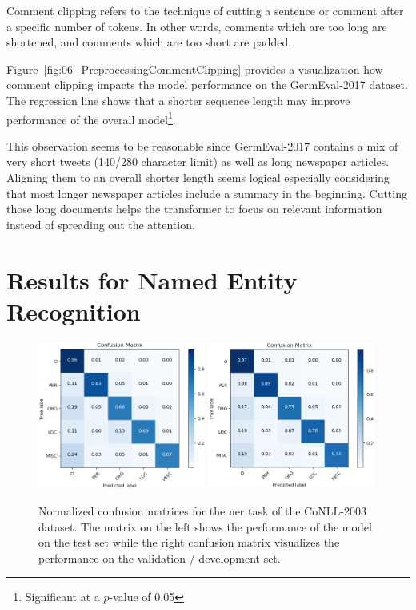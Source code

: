 Comment clipping refers to the technique of cutting a sentence or comment after a specific number of tokens. In other words, comments which are too long are shortened, and comments which are too short are padded.

Figure~\ref{fig:06_PreprocessingCommentClipping} provides a visualization how comment clipping impacts the model performance on the GermEval-2017 dataset. The regression line shows that a shorter sequence length may improve performance of the overall model\footnote{Significant at a $p$-value of 0.05}.
\medskip

This observation seems to be reasonable since GermEval-2017 contains a mix of very short tweets {(140/280 character limit)} as well as long newspaper articles. Aligning them to an overall shorter length seems logical especially considering that most longer newspaper articles include a summary in the beginning. Cutting those long documents helps the transformer to focus on relevant information instead of spreading out the attention.

\section{Results for Named Entity Recognition}

\begin{figure}[ht]
    \centering
    \includegraphics[width=0.49\textwidth]{figures/06_results/06_ner_final_test_c_matrix}
    \includegraphics[width=0.49\textwidth]{figures/06_results/06_ner_final_valid_c_matrix}
    \caption{Normalized confusion matrices for the \gls{ner} task of the CoNLL-2003 dataset. The matrix on the left shows the performance of the model on the test set while the right confusion matrix visualizes the performance on the validation / development set.}
    \label{fig:06_NER_cmatrices}
\end{figure}

